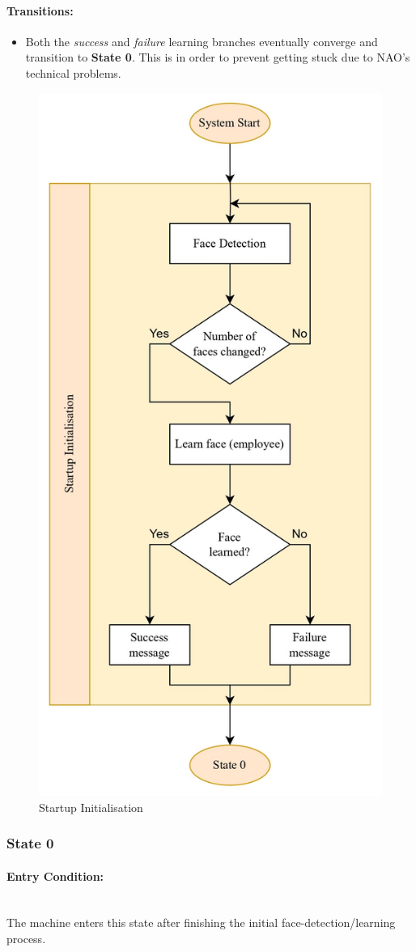 \documentclass[conference]{IEEEtran}
\begin{document}
\paragraph{Transitions:}
\begin{itemize}
  \item Both the \emph{success} and \emph{failure} learning branches eventually converge and transition to \textbf{State 0}. This is in order to prevent getting stuck due to NAO's technical problems.
\end{itemize}

\begin{figure}
    \centering
    \includegraphics[width=.6\linewidth]{Startup Initialisation.jpg}
    \caption{Startup Initialisation}
    \label{Startup Initialisation}
\end{figure}

\subsubsection{State 0}
\paragraph{Entry Condition:}
\mbox{}\\
The machine enters this state after finishing the initial face-detection/learning process.
\end{document}
